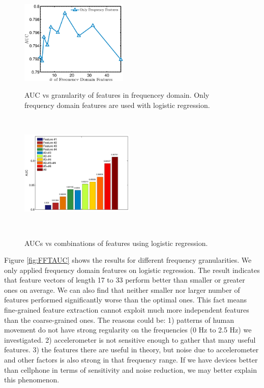 \documentclass{article} %
\begin{document}
\begin{figure}
    \hspace{-0.5cm}
    \begin{minipage}[t]{0.02\textwidth}~
    \end{minipage}
    \begin{minipage}[t]{0.47\textwidth}
    \centering
    \includegraphics[height=40mm]{fig/fftauc.eps}
    \caption{AUC vs granularity of features in frequencey domain. Only frequency domain features are used with logistic regression.}
    \label{fig:FFTAUC}
    \end{minipage}
    \begin{minipage}[t]{0.02\textwidth}~
    \end{minipage}
    \begin{minipage}[t]{0.47\textwidth}
    \centering
    \includegraphics[height=40mm]{fig/feature}\\
    \caption{AUCs vs combinations of features using logistic regression.}
    \label{fig:feature}
    \end{minipage}
    \begin{minipage}[t]{0.02\textwidth}~
    \end{minipage}%
 \end{figure}

Figure \ref{fig:FFTAUC} shows the results for different frequency granularities. We only applied frequency domain features on logistic regression. The result indicates that feature vectors of length 17 to 33 perform better than smaller or greater ones on average. We can also find that neither smaller nor larger number of features performed significantly worse than the optimal ones. This fact means fine-grained feature extraction cannot exploit much more independent features than the coarse-grained ones. The reasons could be: 1) patterns of human movement do not have strong regularity on the frequencies (0 Hz to 2.5 Hz) we investigated. 2) accelerometer is not sensitive enough to gather that many useful features. 3) the features there are useful in theory, but noise due to accelerometer and other factors is also strong in that frequency range. If we have devices better than cellphone in terms of sensitivity and noise reduction, we may better explain this phenomenon.
\end{document}
